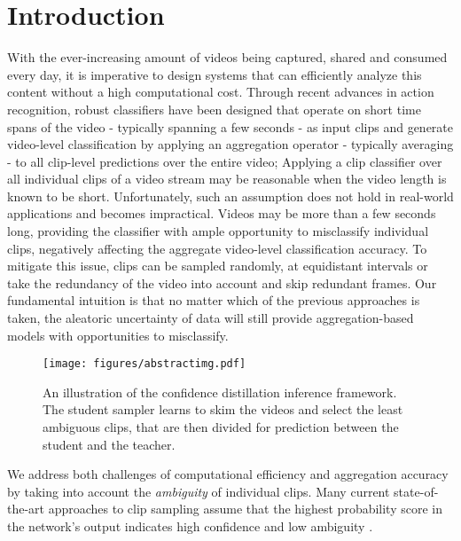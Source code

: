 \documentclass[a4paper,conference]{IEEEtran}
\begin{document}
\IEEEpeerreviewmaketitle



\section{Introduction}
With the ever-increasing amount of videos being captured, shared and consumed every day, it is imperative to design systems that can efficiently analyze this content without a high computational cost. Through recent advances in action recognition, robust classifiers have been designed \cite{Hara_2018_CVPR, tran2015learning, tran2018closer, tran2019video, feichtenhofer2017spatiotemporal, feichtenhofer2019slowfast, feichtenhofer2020x3d} that operate on short time spans of the video - typically spanning a few seconds - as input clips and generate video-level classification by applying an aggregation operator - typically averaging - to all clip-level predictions over the entire video; Applying a clip classifier over all individual clips of a video stream may be reasonable when the video length is known to be short. Unfortunately, such an assumption does not hold in real-world applications and becomes impractical. Videos may be more than a few seconds long, providing the classifier with ample opportunity to misclassify individual clips, negatively affecting the aggregate video-level classification accuracy. To mitigate this issue, clips can be sampled randomly, at equidistant intervals or take the redundancy of the video into account and skip redundant frames. Our fundamental intuition is that no matter which of the previous approaches is taken, the aleatoric uncertainty of data will still provide aggregation-based models with opportunities to misclassify. 

\begin{figure}[t] \centering
    {{\texttt{[image: figures/abstractimg.pdf]}}}\caption{An illustration of the confidence distillation inference framework. The student sampler learns to skim the videos and select the  least ambiguous clips, that are then divided for prediction between the student and the teacher.}\label{fig:abstframework}
\end{figure}

We address both challenges of computational efficiency and aggregation accuracy by taking into account the \textit{ambiguity} of individual clips. Many current state-of-the-art approaches to clip sampling assume that the highest probability score in the network's output indicates high confidence and low ambiguity \cite{korbar2019scsampler, gao2020listen, wu2019adaframe}. 
\end{document}
